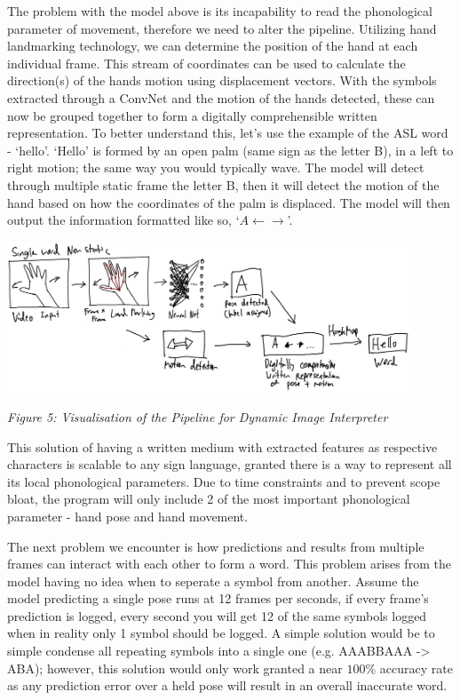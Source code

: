 \documentclass[11pt]{article}
\begin{document}
        The problem with the model above is its incapability to read the phonological parameter of movement, therefore we need to alter the pipeline. Utilizing hand landmarking technology, we can determine the position of the hand at each individual frame. This stream of coordinates can be used to calculate the direction(s) of the hands motion using displacement vectors. With the symbols extracted through a ConvNet and the motion of the hands detected, these can now be grouped together to form a digitally comprehensible written representation. To better understand this, let's use the example of the ASL word - `hello'. `Hello' is formed by an open palm (same sign as the letter B), in a left to right motion; the same way you would typically wave. The model will detect through multiple static frame the letter B, then it will detect the motion of the hand based on how the coordinates of the palm is displaced. The model will then output the information formatted like so, `$A \leftarrow \rightarrow$'.

        \begin{center}
            \includegraphics[width=12cm]{images/nonstaticModel.png}
            \\
            \raggedright \textit{
            Figure 5: Visualisation of the Pipeline for Dynamic Image Interpreter
            }
        \end{center}
        
        This solution of having a written medium with extracted features as respective characters is scalable to any sign language, granted there is a way to represent all its local phonological parameters. Due to time constraints and to prevent scope bloat, the program will only include 2 of the most important phonological parameter - hand pose and hand movement.

        The next problem we encounter is how predictions and results from multiple frames can interact with each other to form a word. This problem arises from the model having no idea when to seperate a symbol from another. Assume the model predicting a single pose runs at 12 frames per seconds, if every frame's prediction is logged, every second you will get 12 of the same symbols logged when in reality only 1 symbol should be logged. A simple solution would be to simple condense all repeating symbols into a single one (e.g. AAABBAAA -> ABA); however, this solution would only work granted a near $100\%$ accuracy rate as any prediction error over a held pose will result in an overall inaccurate word.
        
\end{document}
